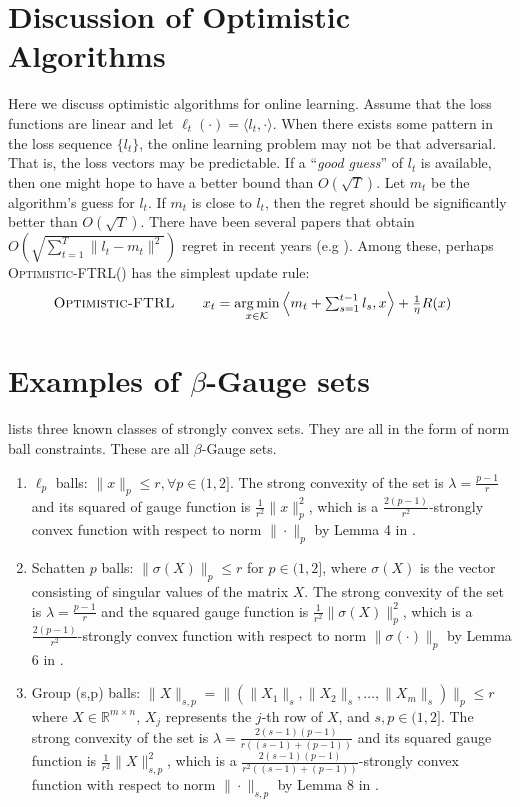 \documentclass[pmlr]{jmlr} %
\def\reals{\mathbb{R}}
\def\reals{\mathbb{R}}
\def\K{\mathcal{K}}
\def\argmin{\mathop{\arg\min}}
\def\OFTRL{\textsc{Optimistic-FTRL}\xspace}
\newcommand{\lr}[2]{\left\langle#1,#2\right\rangle}
\begin{document}
\appendix

\section{Discussion of Optimistic Algorithms}\label{app:optimistic}
Here we discuss optimistic algorithms for online learning. Assume that the loss functions are linear and let $\ell_{t}(\cdot)= \langle l_{t} , \cdot \rangle$.
When there exists some pattern in the loss sequence $\{ l_{t} \}$,
the online learning problem may not be that adversarial.
That is, the loss vectors may be predictable. 
If a ``\emph{good guess}'' of $l_{t}$ is available, then one might hope to have a better bound than $O(\sqrt{T})$. Let $m_{t}$ be the algorithm's guess for $l_{t}$. If $m_{t}$ is close to $l_{t}$, then the regret should be significantly better than $O(\sqrt{T})$.
There have been several papers that obtain $O(\sqrt{ \sum_{t=1}^{T} \| l_{t} -m_{t} \|^{2} } )$ regret in recent years (e.g \cite{CJ12,RK13,SALS15}). 
Among these, perhaps \OFTRL (\cite{SALS15}) has the simplest update rule:
\begin{align}
\OFTRL\quad\quad & x_{t} = \argmin_{x \in \K}\textstyle \lr{ m_{t} + \sum_{s=1}^{t-1} l_{s} }{x} + \frac{1}{\eta} R(x)
\end{align}




\section{Examples of $\beta$-Gauge sets}\label{app:betagauge}
\cite{D15} lists three known classes of strongly convex sets. They are all in the form of norm ball constraints. These are all $\beta$-Gauge sets.
\begin{enumerate}
	\item{$\ell_{p}$ balls: $\| x \|_{p} \leq r, \forall p \in (1,2]$. The strong convexity of the set is $\lambda=\frac{p-1}{r}$ and its squared of gauge function is $\frac{1}{r^{2}} \| x \|_{p}^{2}$, which is a $\frac{2(p-1)}{r^{2}}$-strongly convex function with respect to norm $\| \cdot \|_{p}$ by Lemma 4 in \cite{D15}. }
	\item{Schatten $p$ balls: $\| \sigma(X) \|_{p} \leq r$ for $p \in (1,2]$, where $\sigma(X)$ is the vector consisting of singular values of the matrix $X$. 
		The strong convexity of the set is $\lambda=\frac{p-1}{r}$
		and the squared gauge function is $\frac{1}{r^{2}} \| \sigma(X) \|_{p}^{2}$, which is a $\frac{2(p-1)}{r^{2}}$-strongly convex function with respect to norm $\| \sigma(\cdot) \|_{p} $ by Lemma 6 in \cite{D15}.}
	\item{	Group (s,p) balls: $\| X \|_{s,p}  = \| (\| X_{1}\|_{s}, \| X_{2}\|_{s}, \dots, \| X_{m}\|_{s})  \|_{p} \leq r$
		where $X \in \reals^{{m \times n}}$, $X_{j}$ represents the $j$-th row of $X$, and $s,p \in (1,2]$.
		The strong convexity of the set is $\lambda=\frac{2(s-1)(p-1)}{r( (s-1)+(p-1) ) }$ and its squared gauge function is $\frac{1}{r^{2}} \| X \|_{s,p}^{2}$, which is a $\frac{2(s-1)(p-1)}{r^{2}( (s-1)+(p-1) ) }$-strongly convex function with respect to norm $\| \cdot\|_{s,p}$ by Lemma 8 in \cite{D15}.}
\end{enumerate}
\end{document}

